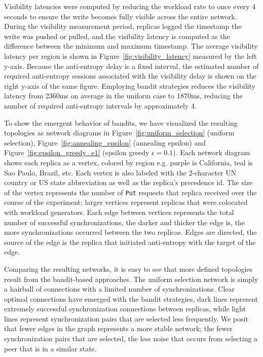 Visibility latencies were computed by reducing the workload rate to once
every 4 seconds to ensure the write becomes fully visible across the entire
network.
During the visibility measurement period, replicas logged the timestamp the
write was pushed or pulled, and the visibility latency is computed as the
difference between the minimum and maximum timestamp.
The average visibility latency per region is shown in
Figure~\ref{fig:visibility_latency} measured by the left y-axis.
Because the anti-entropy delay is a fixed interval, the estimated number of
required anti-entropy sessions associated with the visibility delay is shown
on the right y-axis of the same figure.
Employing bandit strategies reduces the visibility latency from 2360ms on
average in the uniform case to 1870ms, reducing the number of required
anti-entropy intervals by approximately 4.

To show the emergent behavior of bandits, we have visualized the resulting
topologies as network diagrams in Figure~\ref{fig:uniform_selection} (uniform
selection), Figure~\ref{fig:annealing_epsilon} (annealing epsilon) and
Figure~\ref{fig:epsilon_greedy_e1} (epsilon greedy $\epsilon=0.1$).
Each network diagram shows each replica as a vertex, colored by region e.g.
purple is California, teal is Sao Paulo, Brazil, etc.
Each vertex is also labeled with the 2-character UN country or US state
abbreviation as well as the replica's precedence id.
The size of the vertex represents the number of \texttt{Put} requests that
replica received over the course of the experiment; larger vertices
represent replicas that were colocated with workload generators.
Each edge between vertices represents the total number of successful
synchronizations, the darker and thicker the edge is, the more
synchronizations occurred between the two replicas.
Edges are directed, the source of the edge is the replica that initiated
anti-entropy with the target of the edge.

Comparing the resulting networks, it is easy to see that more defined
topologies result from the bandit-based approaches.
The uniform selection network is simply a hairball of connections with
a limited number of synchronizations.
Clear optimal connections have emerged with the bandit strategies, dark
lines represent extremely successful synchronization connections between
replicas, while light lines represent synchronization pairs that are
selected less frequently.
We posit that fewer edges in the graph represents a more stable network;
the fewer synchronization pairs that are selected, the less noise that
occurs from selecting a peer that is in a similar state.

